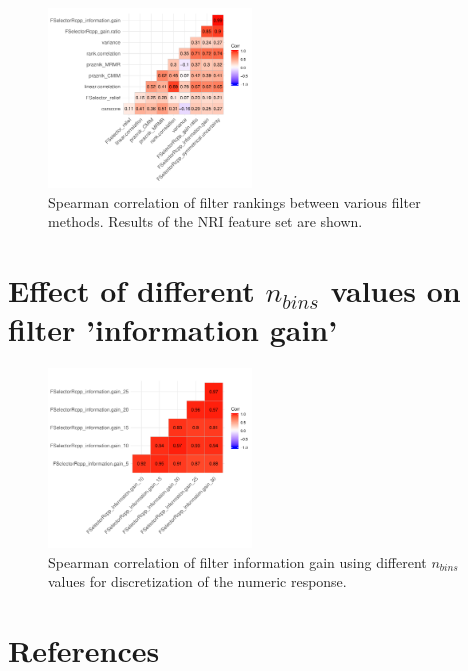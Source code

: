 \documentclass[letterpaper, peerreview]{IEEEtran}
\begin{document}
\begin{figure} [ht]
	\begin{center}
		\includegraphics[width=0.48\textwidth] {correlation-filter-nri-1.pdf}
		\caption{Spearman correlation of filter rankings between various filter methods. Results of the NRI feature set are shown.}\label{fig:correlation-filters}
	\end{center}
\end{figure}

\section{Effect of different \texorpdfstring{\(n_{bins}\)}{nbins} values on filter 'information gain'}

\begin{figure} [ht]
	\begin{center}
		\includegraphics[width=0.48\textwidth] {correlation-nbins-1.pdf}
		\caption{Spearman correlation of filter information gain using different \texttt{\(n_{bins}\)} values for discretization of the numeric response.}\label{fig:correlation-nbins}
	\end{center}
\end{figure}






\section*{References}
\end{document}
